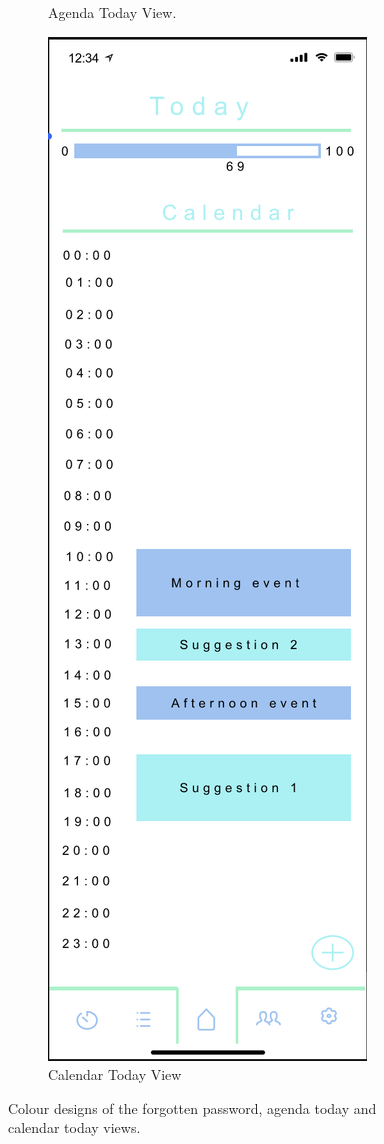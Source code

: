 \begin{figure}[H]
\begin{subfigure}[b]{0.3\textwidth}
        \caption{Agenda Today View.}
        \label{fig:agenda_today_colour}
    \end{subfigure}
    \hfill
    \begin{subfigure}[b]{0.3\textwidth}
        \centering
        \includegraphics[width=\textwidth]{./graphics/design/Dashboard - Calendar View - Today.png}
        \caption{Calendar Today View}
        \label{fig:calendar_today_colour}
    \end{subfigure}
    
    \caption{Colour designs of the forgotten password, agenda today and calendar today views.}
    \label{fig:forgottenpassword_agendatoday_calendartoday_colour}
\end{figure}

